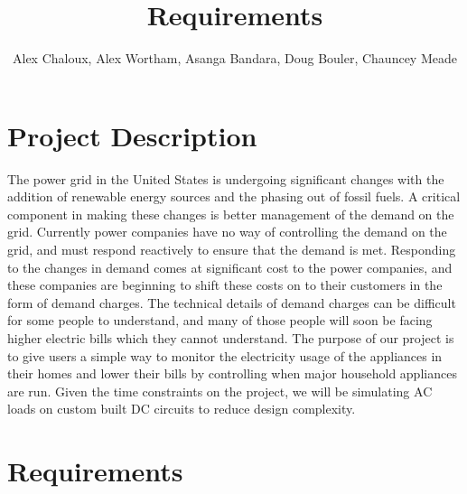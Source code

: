 \documentclass[12pt,letterpaper]{article}
\title{Requirements}
\author{Alex Chaloux, Alex Wortham, Asanga Bandara, Doug Bouler, Chauncey Meade}
\begin{document}
\reqstitlepage

\tableofcontents
\clearpage

\section{Project Description}

The power grid in the United States is undergoing significant changes with
the addition of renewable energy sources and the phasing out of fossil
fuels.  A critical component in making these changes is better management of
the demand on the grid.  Currently power companies have no way of controlling
the demand on the grid, and must respond reactively to ensure that the demand is
met.  Responding to the changes in demand comes at significant cost to the power
companies, and these companies are beginning to shift these costs on to their
customers in the form of demand charges.  The technical details of demand
charges can be difficult for some people to understand, and many of those people
will soon be facing higher electric bills which they cannot understand.  The
purpose of our project is to give users a simple way to monitor the electricity
usage of the appliances in their homes and lower their bills by controlling when
major household appliances are run.  Given the time constraints on the project, we will be
simulating AC loads on custom built DC circuits to reduce design complexity.  


\clearpage
\section{Requirements}
\end{document}
